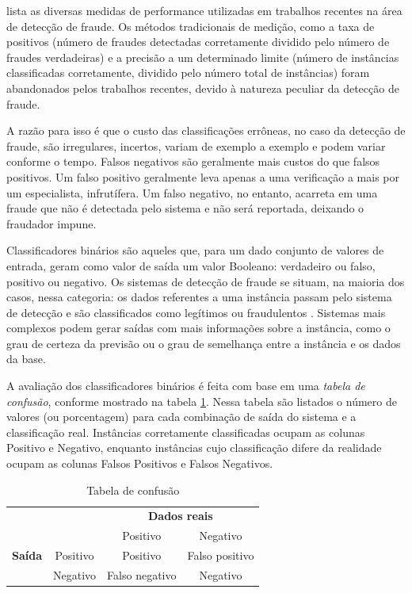 \citet{Phua2010} lista as diversas medidas de performance utilizadas em trabalhos recentes na área de detecção de fraude. Os métodos tradicionais de medição, como a taxa de positivos (número de fraudes detectadas corretamente dividido pelo número de fraudes verdadeiras) e a precisão a um determinado limite (número de instâncias classificadas corretamente, dividido pelo número total de instâncias) foram abandonados pelos trabalhos recentes, devido à natureza peculiar da detecção de fraude.

A razão para isso é que o custo das classificações errôneas, no caso da detecção de fraude, são irregulares, incertos, variam de exemplo a exemplo e podem variar conforme o tempo. Falsos negativos são geralmente mais custos do que falsos positivos. Um falso positivo geralmente leva apenas a uma verificação a mais por um especialista, infrutífera. Um falso negativo, no entanto, acarreta em uma fraude que não é detectada pelo sistema e não será reportada, deixando o fraudador impune.

Classificadores binários são aqueles que, para um dado conjunto de valores de entrada, geram como valor de saída um valor Booleano: verdadeiro ou falso, positivo ou negativo. Os sistemas de detecção de fraude se situam, na maioria dos casos, nessa categoria: os dados referentes a uma instância passam pelo sistema de detecção e são classificados como legítimos ou fraudulentos \cite{Bewick2004}. Sistemas mais complexos podem gerar saídas com mais informações sobre a instância, como o grau de certeza da previsão ou o grau de semelhança entre a instância e os dados da base.

A avaliação dos classificadores binários é feita com base em uma \emph{tabela de confusão}, conforme mostrado na tabela \ref{fraud:confusion}. Nessa tabela são listados o número de valores (ou porcentagem) para cada combinação de saída do sistema e a classificação real. Instâncias corretamente classificadas ocupam as colunas Positivo e Negativo, enquanto instâncias cujo classificação difere da realidade ocupam as colunas Falsos Positivos e Falsos Negativos.

\renewcommand{\arraystretch}{1.5}
\vspace{2mm}
\begin{table}[h!]
    \centering
    \begin{tabular}{c l c c}
        & & \multicolumn{2}{c}{\textbf{Dados reais}} \\
        \multirow{3}{5mm}{\begin{sideways}\parbox{20mm}{\textbf{Saída}}\end{sideways}} & \multicolumn{1}{c|}{} & Positivo & Negativo \\
        \cline{2-4}
        & \multicolumn{1}{c|}{Positivo} & Positivo & Falso positivo\\
        & \multicolumn{1}{c|}{Negativo} & Falso negativo & Negativo\\
    \end{tabular}
    \caption{Tabela de confusão}
    \label{fraud:confusion}
\end{table}
\vspace{2mm}

